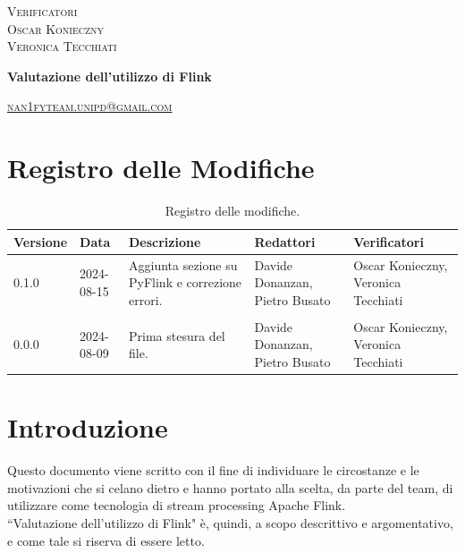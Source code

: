 \documentclass[8pt]{article}
\begin{document}
\begin{titlepage}
\begin{minipage}[t]{0.47\textwidth}
{		}
		\vspace{8mm}
		
		{\large{\textsc{Verificatori}}
			\vspace{3mm}
			{\\\large{\textsc{Oscar Konieczny}\\}}  %
			{\large{\textsc{Veronica Tecchiati}}}
			
		}
		\vspace{4mm}\vspace{4mm}
	\end{minipage}
	\vspace{4cm}
	\begin{center}
		\begin{flushright}
			{\fontsize{30pt}{52pt}\selectfont \textbf{Valutazione dell'utilizzo di Flink\\}} %
		\end{flushright}
		\vspace{3cm}
	\end{center}
	\vspace{9.5cm}
	{\small \textsc{\href{mailto: nan1fyteam.unipd@gmail.com}{nan1fyteam.unipd@gmail.com}}}
\end{titlepage}
\pagestyle{mystyle}
\section*{Registro delle Modifiche}
\begin{table}[ht!]
\hypersetup{hidelinks}
	\centering
	\begin{tabular}{p{1.2cm} p{2cm} p{4cm} p{4cm} p{3cm}}
		\toprule
		\textbf{Versione} & \textbf{Data} & \textbf{Descrizione} & \textbf{Redattori} & \textbf{Verificatori} \\
		\midrule
			0.1.0 & 2024-08-15 & Aggiunta sezione su PyFlink e correzione errori. & Davide Donanzan, Pietro Busato & Oscar Konieczny, Veronica Tecchiati \\\\
            0.0.0 & 2024-08-09 & Prima stesura del file. & Davide Donanzan, Pietro Busato & Oscar Konieczny, Veronica Tecchiati \\
		\bottomrule
	\end{tabular}
	\caption{Registro delle modifiche.}\label{table:Registro delle modifiche}
\end{table}
\newpage
\tableofcontents
\clearpage
\newpage
\justifying
\section{Introduzione}
Questo documento viene scritto con il fine di individuare le circostanze e le motivazioni che si celano dietro e hanno portato alla scelta, da parte del team, di utilizzare come tecnologia di stream processing Apache Flink.\\
``Valutazione dell'utilizzo di Flink" è, quindi, a scopo descrittivo e argomentativo, e come tale si riserva di essere letto.
\end{document}
